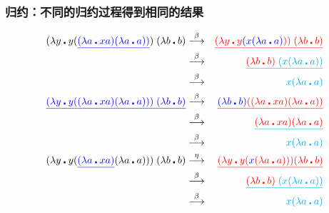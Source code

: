 \documentclass[CJK,compress,hyperref]{beamer}
\begin{document}
\begin{CJK}{UTF8}{song}
\begin{frame}
  \frametitle{归约：不同的归约过程得到相同的结果} 
  \label{parad}
  \begin{eqnarray*}
    (\lambda y \centerdot y({\color{blue}\underline{(\lambda a \centerdot xa) (\lambda a \centerdot a))}})\;(\lambda b \centerdot b) & \stackrel{\beta}{\longrightarrow} & {\color{red}\underline{(\lambda y \centerdot y{\color{blue}(x (\lambda a \centerdot a)})) \; (\lambda b \centerdot b)}}   \\ 
                                                                                                                                     &  \stackrel{\beta}{\longrightarrow} & {\color{cyan}\underline{{\color{red}(\lambda b \centerdot b)}\;(x (\lambda a \centerdot a))}} \\
                                                                                                                                     & \stackrel{\beta}{\longrightarrow} & {\color{cyan}x(\lambda a \centerdot a)} \\
    {\color{blue}\underline{(\lambda y \centerdot y((\lambda a \centerdot xa) (\lambda a \centerdot a)))\;(\lambda b \centerdot b)}} & \stackrel{\beta}{\longrightarrow} & {\color{red}\underline{{\color{blue}(\lambda b \centerdot b)}((\lambda a \centerdot xa) (\lambda a \centerdot a))}}   \\ 
                                                                                                                                     &  \stackrel{\beta}{\longrightarrow} & {\color{cyan}\underline{{\color{red}(\lambda a \centerdot xa) (\lambda a \centerdot a)}}} \\
                                                                                                                                     & \stackrel{\beta}{\longrightarrow} & {\color{cyan}x(\lambda a \centerdot a)} \\
    (\lambda y \centerdot y({\color{blue}\underline{(\lambda a \centerdot xa)}} (\lambda a \centerdot a)))\;(\lambda b \centerdot b) &   \stackrel{\eta}{\longrightarrow} & {\color{red}\underline{(\lambda y \centerdot y ({\color{blue}x} (\lambda a \centerdot a))) (\lambda b \centerdot b)}}  \\   
                                                                                                                                     &  \stackrel{\beta}{\longrightarrow} & {\color{cyan}\underline{{\color{red}(\lambda b \centerdot b)}\;(x (\lambda a \centerdot a))}} \\
                                                                                                                                     & \stackrel{\beta}{\longrightarrow} & {\color{cyan}x(\lambda a \centerdot a)}
  \end{eqnarray*}
\end{frame}


\end{CJK}
\end{document}
